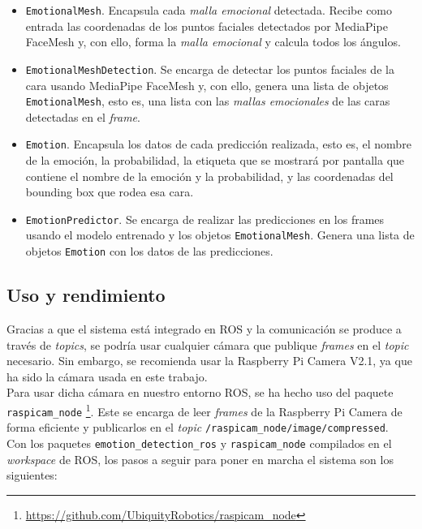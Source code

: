 \begin{itemize}
    \item \verb|EmotionalMesh|. Encapsula cada \textit{malla emocional} detectada. Recibe como entrada las coordenadas de los puntos faciales detectados por MediaPipe FaceMesh y, con ello, forma la \textit{malla emocional} y calcula todos los ángulos.
    
    \item \verb|EmotionalMeshDetection|. Se encarga de detectar los puntos faciales de la cara usando MediaPipe FaceMesh y, con ello, genera una lista de objetos \verb|EmotionalMesh|, esto es, una lista con las \textit{mallas emocionales} de las caras detectadas en el \textit{frame}.
    
    \item \verb|Emotion|. Encapsula los datos de cada predicción realizada, esto es, el nombre de la emoción, la probabilidad, la etiqueta que se mostrará por pantalla que contiene el nombre de la emoción y la probabilidad, y las coordenadas del bounding box que rodea esa cara.
    
    \item \verb|EmotionPredictor|. Se encarga de realizar las predicciones en los frames usando el modelo entrenado y los objetos \verb|EmotionalMesh|. Genera una lista de objetos \verb|Emotion| con los datos de las predicciones.
\end{itemize}

\subsection{Uso y rendimiento}

Gracias a que el sistema está integrado en ROS y la comunicación se produce a través de \textit{topics}, se podría usar cualquier cámara que publique \textit{frames} en el \textit{topic} necesario. Sin embargo, se recomienda usar la Raspberry Pi Camera V2.1, ya que ha sido la cámara usada en este trabajo.\\

Para usar dicha cámara en nuestro entorno ROS, se ha hecho uso del paquete \verb|raspicam_node| \footnote{\url{https://github.com/UbiquityRobotics/raspicam_node}}. Este se encarga de leer \textit{frames} de la Raspberry Pi Camera de forma eficiente y publicarlos en el \textit{topic} \verb|/raspicam_node/image/compressed|.\\

Con los paquetes \verb|emotion_detection_ros| y \verb|raspicam_node| compilados en el \textit{workspace} de ROS, los pasos a seguir para poner en marcha el sistema son los siguientes:

